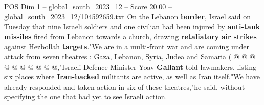 \begin{textsample}{POS Dim 1 – global\_south\_2023\_12 – Score 20.00 – global\_south\_2023\_12/104592659.txt}
On the Lebanon \textbf{border}, Israel said on Tuesday that nine Israeli soldiers and one civilian had been injured by \textbf{anti-tank} \textbf{missiles} fired from Lebanon towards a church, drawing \textbf{retaliatory} \textbf{air} \textbf{strikes} against Hezbollah \textbf{targets}."We are in a multi-front war and are coming under attack from seven theatres : Gaza, Lebanon, Syria, Judea and Samaria ( @ @ @ @ @ @ @ @ @ @,"Israeli Defence Minister Yoav \textbf{Gallant} told lawmakers, listing six places where \textbf{Iran-backed} militants are active, as well as Iran itself."We have already responded and taken action in six of these theatres,"he said, without specifying the one that had yet to see Israeli action.

\end{textsample}
